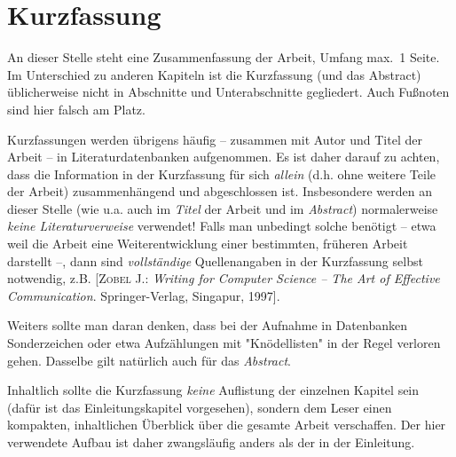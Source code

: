 \chapter*{Kurzfassung}

An dieser Stelle steht eine Zusammenfassung der Arbeit, Umfang
max.\ 1 Seite. Im Unterschied zu anderen Kapiteln ist die
Kurzfassung (und das Abstract) üblicherweise nicht in Abschnitte
und Unterabschnitte gegliedert. 
Auch Fußnoten sind hier falsch am Platz.

Kurzfassungen werden übrigens häufig -- zusammen mit Autor und Titel
der Arbeit -- %
in Literaturdatenbanken aufgenommen. Es ist daher darauf zu
achten, dass die Information in der Kurzfassung für sich 
\emph{allein} (d.h. ohne weitere Teile der Arbeit) zusammenhängend und
abgeschlossen ist. Insbesondere werden an dieser Stelle (wie u.a.
auch im \emph{Titel} der Arbeit und im \emph{Abstract})
normalerweise \emph{keine Literaturverweise} verwendet! Falls man
unbedingt solche benötigt -- etwa weil die Arbeit eine
Weiterentwicklung einer bestimmten, früheren Arbeit darstellt --,
dann sind \emph{vollständige} Quellenangaben in der Kurzfassung
selbst notwendig, z.B. %
[\textsc{Zobel} J.: \textit{Writing for Computer Science -- The Art of
Effective Commu\-nica\-tion}. Springer-Verlag, Singa\-pur, 1997].

Weiters sollte man daran denken, dass bei der Aufnahme in Datenbanken
Sonderzeichen oder etwa Aufzählungen mit "Knödellisten" in der
Regel verloren gehen. Dasselbe gilt natürlich auch für das 
\emph{Abstract}.


Inhaltlich sollte die Kurzfassung \emph{keine} Auflistung der
einzelnen Kapitel sein (dafür ist das Einleitungskapitel
vorgesehen), sondern dem Leser einen kompakten, inhaltlichen
Überblick über die gesamte Arbeit verschaffen. Der hier verwendete
Aufbau ist daher zwangsläufig anders als der in der Einleitung.
